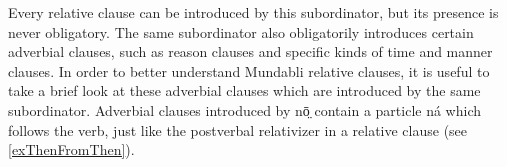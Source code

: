 \documentclass[10pt,twoside]{article}
\def\ci#1{{\ipaFont #1}}
\newcommand{\comment}[1]{\textcolor{blue}{\emph{#1}}}
\begin{document}
\noindent
Every relative clause can be introduced by this subordinator, but its presence is never obligatory.
%
The same subordinator also obligatorily introduces certain adverbial clauses, 
such as reason clauses and specific kinds of time and manner clauses. In order to better understand 
Mundabli relative clauses, it is useful to take a brief look at these adverbial clauses which are 
introduced by the same subordinator. Adverbial clauses introduced by \ci{nō̤} contain a 
particle \ci{ná} which follows the verb, just like the postverbal relativizer in a 
relative clause (see \ref{exThenFromThen}).
%
\end{document}
